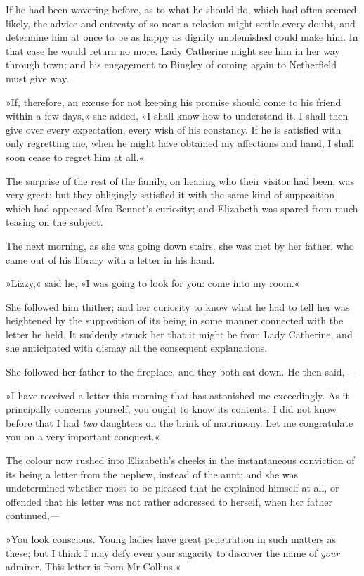 If he had been wavering before, as to what he should do, which had often seemed likely, the advice and entreaty of so near a relation might settle every doubt, and determine him at once to be as happy as dignity unblemished could make him. In that case he would return no more. Lady Catherine might see him in her way through town; and his engagement to Bingley of coming again to Netherfield must give way.

»If, therefore, an excuse for not keeping his promise should come to his friend within a few days,« she added, »I shall know how to understand it. I shall then give over every expectation, every wish of his constancy. If he is satisfied with only regretting me, when he might have obtained my affections and hand, I shall soon cease to regret him at all.«

The surprise of the rest of the family, on hearing who their visitor had been, was very great: but they obligingly satisfied it with the same kind of supposition which had appeased Mrs Bennet's curiosity; and Elizabeth was spared from much teasing on the subject.

The next morning, as she was going down stairs, she was met by her father, who came out of his library with a letter in his hand.

»Lizzy,« said he, »I was going to look for you: come into my room.«

She followed him thither; and her curiosity to know what he had to tell her was heightened by the supposition of its being in some manner connected with the letter he held. It suddenly struck her that it might be from Lady Catherine, and she anticipated with dismay all the consequent explanations.

She followed her father to the fireplace, and they both sat down. He then said,—

»I have received a letter this morning that has astonished me exceedingly. As it principally concerns yourself, you ought to know its contents. I did not know before that I had \textit{two} daughters on the brink of matrimony. Let me congratulate you on a very important conquest.«

The colour now rushed into Elizabeth's cheeks in the instantaneous conviction of its being a letter from the nephew, instead of the aunt; and she was undetermined whether most to be pleased that he explained himself at all, or offended that his letter was not rather addressed to herself, when her father continued,—

»You look conscious. Young ladies have great penetration in such matters as these; but I think I may defy even your sagacity to discover the name of \textit{your} admirer. This letter is from Mr Collins.«

